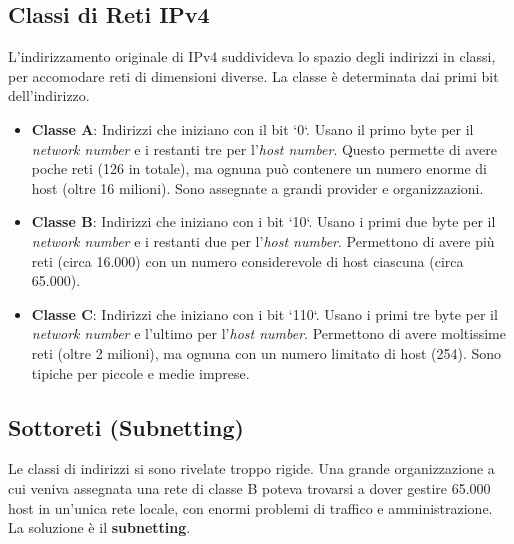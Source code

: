 \subsection{Classi di Reti IPv4}
L'indirizzamento originale di IPv4 suddivideva lo spazio degli indirizzi in classi, per accomodare reti di dimensioni diverse. La classe è determinata dai primi bit dell'indirizzo.
\begin{itemize}
    \item \textbf{Classe A}: Indirizzi che iniziano con il bit `0`. Usano il primo byte per il \textit{network number} e i restanti tre per l'\textit{host number}. Questo permette di avere poche reti (126 in totale), ma ognuna può contenere un numero enorme di host (oltre 16 milioni). Sono assegnate a grandi provider e organizzazioni.
    \item \textbf{Classe B}: Indirizzi che iniziano con i bit `10`. Usano i primi due byte per il \textit{network number} e i restanti due per l'\textit{host number}. Permettono di avere più reti (circa 16.000) con un numero considerevole di host ciascuna (circa 65.000).
    \item \textbf{Classe C}: Indirizzi che iniziano con i bit `110`. Usano i primi tre byte per il \textit{network number} e l'ultimo per l'\textit{host number}. Permettono di avere moltissime reti (oltre 2 milioni), ma ognuna con un numero limitato di host (254). Sono tipiche per piccole e medie imprese.
\end{itemize}

\subsection{Sottoreti (Subnetting)}
Le classi di indirizzi si sono rivelate troppo rigide. Una grande organizzazione a cui veniva assegnata una rete di classe B poteva trovarsi a dover gestire 65.000 host in un'unica rete locale, con enormi problemi di traffico e amministrazione. La soluzione è il \textbf{subnetting}.


